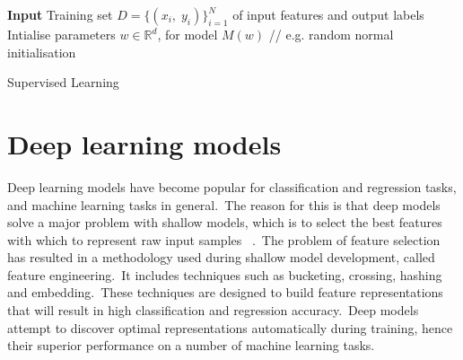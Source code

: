 \bigskip

\begin{algorithm}[H]
	\SetAlgoLined
	\textbf{Input} 
	Training set \begin{math} D = \{(x_i, \; y_i)\}_{i=1}^N \end{math} of input features and output labels\;
	Intialise parameters $w \in \mathbb{R}^d$, for model \begin{math} M(w) \end{math} // e.g. random normal initialisation \\
	\caption{Supervised Learning}
\end{algorithm}



\section{Deep learning models}

Deep learning models have become popular for classification and regression tasks, and machine learning tasks in general.\ The reason for this is that deep models solve a major problem with shallow models, which is to select the best features with which to represent raw input samples \unskip ~\citep{Goodfellow-et-al-2016}.\ The problem of feature selection has resulted in a methodology used during shallow model development, called feature engineering.\ It includes techniques such as bucketing, crossing, hashing and embedding.\ These techniques are designed to build feature representations that will result in high classification and regression accuracy.\ Deep models attempt to discover optimal representations automatically during training, hence their superior performance on a number of machine learning tasks. \par

